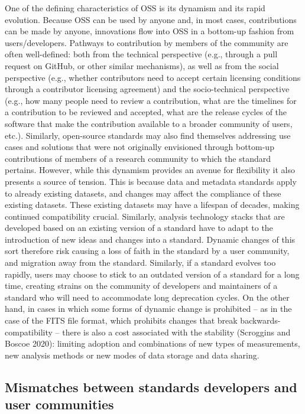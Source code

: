 \documentclass[
  letterpaper,
  DIV=11,
  numbers=noendperiod]{scrartcl}
\begin{document}
One of the defining characteristics of OSS is its dynamism and its rapid
evolution. Because OSS can be used by anyone and, in most cases,
contributions can be made by anyone, innovations flow into OSS in a
bottom-up fashion from users/developers. Pathways to contribution by
members of the community are often well-defined: both from the technical
perspective (e.g., through a pull request on GitHub, or other similar
mechanisms), as well as from the social perspective (e.g., whether
contributors need to accept certain licensing conditions through a
contributor licensing agreement) and the socio-technical perspective
(e.g., how many people need to review a contribution, what are the
timelines for a contribution to be reviewed and accepted, what are the
release cycles of the software that make the contribution available to a
broader community of users, etc.). Similarly, open-source standards may
also find themselves addressing use cases and solutions that were not
originally envisioned through bottom-up contributions of members of a
research community to which the standard pertains. However, while this
dynamism provides an avenue for flexibility it also presents a source of
tension. This is because data and metadata standards apply to already
existing datasets, and changes may affect the compliance of these
existing datasets. These existing datasets may have a lifespan of
decades, making continued compatibility crucial. Similarly, analysis
technology stacks that are developed based on an existing version of a
standard have to adapt to the introduction of new ideas and changes into
a standard. Dynamic changes of this sort therefore risk causing a loss
of faith in the standard by a user community, and migration away from
the standard. Similarly, if a standard evolves too rapidly, users may
choose to stick to an outdated version of a standard for a long time,
creating strains on the community of developers and maintainers of a
standard who will need to accommodate long deprecation cycles. On the
other hand, in cases in which some forms of dynamic change is prohibited
-- as in the case of the FITS file format, which prohibits changes that
break backwards-compatibility -- there is also a cost associated with
the stability (Scroggins and Boscoe 2020): limiting adoption and
combinations of new types of measurements, new analysis methods or new
modes of data storage and data sharing.

\subsection{Mismatches between standards developers and user
communities}\label{mismatches-between-standards-developers-and-user-communities}
\end{document}
